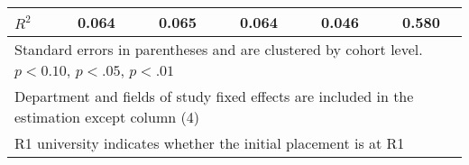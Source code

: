 \begin{table}[ht]
{\begin{tabular}{l*{5}{c}}
\(R^{2}\)   &       0.064         &       0.065         &       0.064         &       0.046         &       0.580         \\
\hline\hline
\multicolumn{6}{l}{\footnotesize Standard errors in parentheses and are clustered by cohort level. \sym{*} \(p<0.10\), \sym{**} \(p<.05\), \sym{***} \(p<.01\)}\\
\multicolumn{6}{l}{\footnotesize Department and fields of study fixed effects are included in the estimation  except column (4)}\\
\multicolumn{6}{l}{\footnotesize R1 university indicates whether the initial placement is at R1}\\
\end{tabular}%
}
\end{table}
